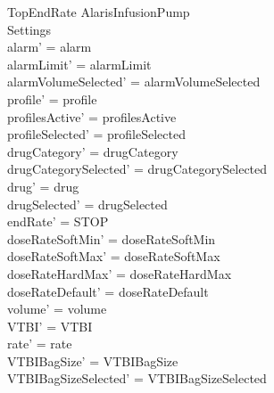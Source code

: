 \begin{schema}{TopEndRate}
	\Delta AlarisInfusionPump\\
	 Settings\\
	\where
	alarm' = alarm\\
	alarmLimit' = alarmLimit\\
	alarmVolumeSelected' = alarmVolumeSelected\\
	profile' = profile\\
	profilesActive' = profilesActive\\
	profileSelected' = profileSelected\\
	drugCategory' = drugCategory\\ 
	drugCategorySelected' = drugCategorySelected\\
	drug' = drug\\ 
	drugSelected' = drugSelected\\
	endRate' = STOP\\
	doseRateSoftMin' = doseRateSoftMin\\
	doseRateSoftMax' = doseRateSoftMax\\
	doseRateHardMax' = doseRateHardMax\\
	doseRateDefault' = doseRateDefault\\
	volume' = volume\\
	VTBI' = VTBI\\
	rate' = rate\\
	VTBIBagSize' = VTBIBagSize\\ 
	VTBIBagSizeSelected' = VTBIBagSizeSelected\\

\end{schema}
